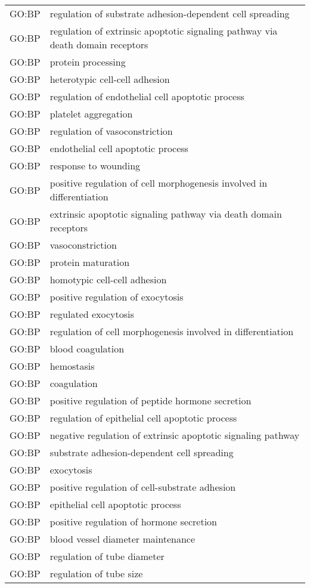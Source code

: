 \begin{longtable}{ll}
GO:BP & regulation of substrate adhesion-dependent cell spreading\\
GO:BP & regulation of extrinsic apoptotic signaling pathway via death domain receptors\\
GO:BP & protein processing\\
GO:BP & heterotypic cell-cell adhesion\\
GO:BP & regulation of endothelial cell apoptotic process\\
GO:BP & platelet aggregation\\
GO:BP & regulation of vasoconstriction\\
GO:BP & endothelial cell apoptotic process\\
GO:BP & response to wounding\\
GO:BP & positive regulation of cell morphogenesis involved in differentiation\\
GO:BP & extrinsic apoptotic signaling pathway via death domain receptors\\
GO:BP & vasoconstriction\\
GO:BP & protein maturation\\
GO:BP & homotypic cell-cell adhesion\\
GO:BP & positive regulation of exocytosis\\
GO:BP & regulated exocytosis\\
GO:BP & regulation of cell morphogenesis involved in differentiation\\
GO:BP & blood coagulation\\
GO:BP & hemostasis\\
GO:BP & coagulation\\
GO:BP & positive regulation of peptide hormone secretion\\
GO:BP & regulation of epithelial cell apoptotic process\\
GO:BP & negative regulation of extrinsic apoptotic signaling pathway\\
GO:BP & substrate adhesion-dependent cell spreading\\
GO:BP & exocytosis\\
GO:BP & positive regulation of cell-substrate adhesion\\
GO:BP & epithelial cell apoptotic process\\
GO:BP & positive regulation of hormone secretion\\
GO:BP & blood vessel diameter maintenance\\
GO:BP & regulation of tube diameter\\
GO:BP & regulation of tube size\\

\end{longtable}
